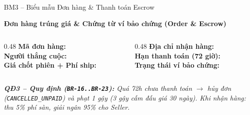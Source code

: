 \documentclass[aspectratio=169, 10pt]{beamer}
\begin{document}
\begin{frame}{BM3 -- Biểu mẫu Đơn hàng \& Thanh toán Escrow}
    \begin{block}{\centering \textbf{Đơn hàng trúng giá \& Chứng từ ví bảo chứng (Order \& Escrow)}}
        \vspace{0.15cm}
        \begin{columns}[t]
            \begin{column}{0.48\textwidth}
                \textbf{Mã đơn hàng:} \hrulefill \\[0.25cm]
                \textbf{Người thắng cuộc:} \hrulefill \\[0.25cm]
                \textbf{Giá chốt phiên + Phí ship:} \hrulefill
            \end{column}
            \begin{column}{0.48\textwidth}
                \textbf{Địa chỉ nhận hàng:} \hrulefill \\[0.25cm]
                \textbf{Hạn thanh toán (72 giờ):} \hrulefill \\[0.25cm]
                \textbf{Trạng thái ví bảo chứng:} \hrulefill
            \end{column}
        \end{columns}
        \vspace{0.15cm}
    \end{block}
    \vspace{0.25cm}
    \centering
    \textit{\small \textbf{QĐ3 -- Quy định (\texttt{BR-16..BR-23}):} Quá 72h chưa thanh toán $\rightarrow$ hủy đơn (\texttt{CANCELLED\_UNPAID}) và phạt 1 gậy (3 gậy cấm đấu giá 30 ngày). Khi nhận hàng: thu 5\% phí sàn, giải ngân 95\% cho Seller.}
\end{frame}
\end{document}
